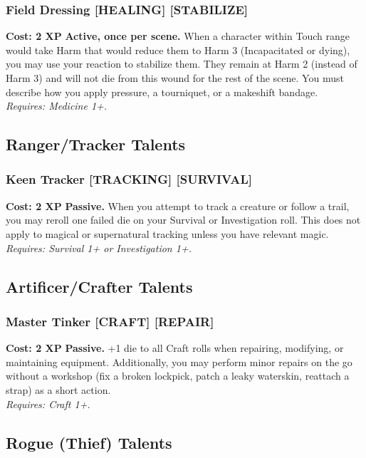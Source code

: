 \subsubsection*{Field Dressing \textnormal{[HEALING] [STABILIZE]}}
\label{talent:field-dressing}
\textbf{Cost: 2 XP} \textbf{Active, once per scene.} When a character within Touch range would take Harm that would reduce them to Harm 3 (Incapacitated or dying), you may use your reaction to stabilize them. They remain at Harm 2 (instead of Harm 3) and will not die from this wound for the rest of the scene. You must describe how you apply pressure, a tourniquet, or a makeshift bandage. \\
\textit{Requires: Medicine 1+.}

\subsection*{Ranger/Tracker Talents}
\label{sec:minor-ranger}

\subsubsection*{Keen Tracker \textnormal{[TRACKING] [SURVIVAL]}}
\label{talent:keen-tracker}
\textbf{Cost: 2 XP} \textbf{Passive.} When you attempt to track a creature or follow a trail, you may reroll one failed die on your Survival or Investigation roll. This does not apply to magical or supernatural tracking unless you have relevant magic. \\
\textit{Requires: Survival 1+ or Investigation 1+.}

\subsection*{Artificer/Crafter Talents}
\label{sec:minor-artificer}

\subsubsection*{Master Tinker \textnormal{[CRAFT] [REPAIR]}}
\label{talent:master-tinker}
\textbf{Cost: 2 XP} \textbf{Passive.} +1 die to all Craft rolls when repairing, modifying, or maintaining equipment. Additionally, you may perform minor repairs on the go without a workshop (fix a broken lockpick, patch a leaky waterskin, reattach a strap) as a short action. \\
\textit{Requires: Craft 1+.}

\subsection*{Rogue (Thief) Talents}
\label{sec:minor-rogue}

